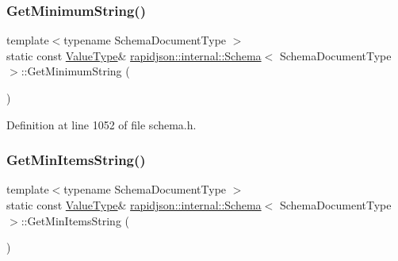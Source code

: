\subsubsection{\texorpdfstring{GetMinimumString()}{GetMinimumString()}}
{\footnotesize\ttfamily template$<$typename Schema\+Document\+Type $>$ \\
static const \mbox{\hyperlink{classrapidjson_1_1internal_1_1_schema_a3979a9083c598195927c08c6e3ba91d1}{Value\+Type}}\& \mbox{\hyperlink{classrapidjson_1_1internal_1_1_schema}{rapidjson\+::internal\+::\+Schema}}$<$ Schema\+Document\+Type $>$\+::Get\+Minimum\+String (\begin{DoxyParamCaption}{ }\end{DoxyParamCaption})\hspace{0.3cm}{\ttfamily [static]}}



Definition at line 1052 of file schema.\+h.


\begin{DoxyCode}{0}

\end{DoxyCode}
\mbox{\label{classrapidjson_1_1internal_1_1_schema_a7b85974e0b6dade12e67760627e30689}} 
\subsubsection{\texorpdfstring{GetMinItemsString()}{GetMinItemsString()}}
{\footnotesize\ttfamily template$<$typename Schema\+Document\+Type $>$ \\
static const \mbox{\hyperlink{classrapidjson_1_1internal_1_1_schema_a3979a9083c598195927c08c6e3ba91d1}{Value\+Type}}\& \mbox{\hyperlink{classrapidjson_1_1internal_1_1_schema}{rapidjson\+::internal\+::\+Schema}}$<$ Schema\+Document\+Type $>$\+::Get\+Min\+Items\+String (\begin{DoxyParamCaption}{ }\end{DoxyParamCaption})\hspace{0.3cm}{\ttfamily [static]}}



